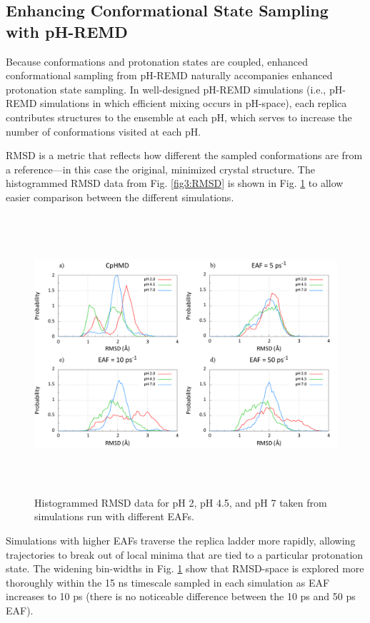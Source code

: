\subsection{Enhancing Conformational State Sampling with pH-REMD}

Because conformations and protonation states are coupled, enhanced
conformational sampling from pH-REMD naturally accompanies enhanced protonation
state sampling. In well-designed pH-REMD simulations (i.e., pH-REMD simulations
in which efficient mixing occurs in pH-space), each replica contributes
structures to the ensemble at each pH, which serves to increase the number of
conformations visited at each pH.

RMSD is a metric that reflects how different the sampled conformations are from
a reference---in this case the original, minimized crystal structure.  The
histogrammed RMSD data from Fig. \ref{fig3:RMSD} is shown in Fig.
\ref{fig3:RMSD_bin} to allow easier comparison between the different
simulations.

\begin{figure}
 \includegraphics[width=6.5in, height=4.06in]{1AKI_RMSD_Comparison_bins.png}
 \caption{Histogrammed RMSD data for pH 2, pH 4.5, and pH 7 taken from
          simulations run with different EAFs.}
 \label{fig3:RMSD_bin}
\end{figure}

Simulations with higher EAFs traverse the replica ladder more rapidly, allowing
trajectories to break out of local minima that are tied to a particular
protonation state.  The widening bin-widths in Fig. \ref{fig3:RMSD_bin} show
that RMSD-space is explored more thoroughly within the 15 ns timescale sampled
in each simulation as EAF increases to 10 ps (there is no noticeable
difference between the 10 ps and 50 ps EAF).

